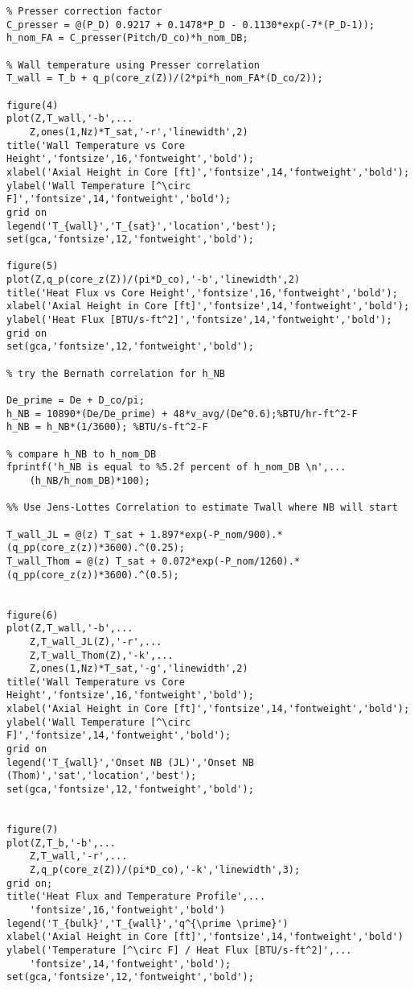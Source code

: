 \begin{fullwidth}
\begin{lstlisting}
% Presser correction factor
C_presser = @(P_D) 0.9217 + 0.1478*P_D - 0.1130*exp(-7*(P_D-1));
h_nom_FA = C_presser(Pitch/D_co)*h_nom_DB;

% Wall temperature using Presser correlation
T_wall = T_b + q_p(core_z(Z))/(2*pi*h_nom_FA*(D_co/2));

figure(4)
plot(Z,T_wall,'-b',...
    Z,ones(1,Nz)*T_sat,'-r','linewidth',2)
title('Wall Temperature vs Core Height','fontsize',16,'fontweight','bold');
xlabel('Axial Height in Core [ft]','fontsize',14,'fontweight','bold');
ylabel('Wall Temperature [^\circ F]','fontsize',14,'fontweight','bold');
grid on
legend('T_{wall}','T_{sat}','location','best');
set(gca,'fontsize',12,'fontweight','bold');

figure(5)
plot(Z,q_p(core_z(Z))/(pi*D_co),'-b','linewidth',2)
title('Heat Flux vs Core Height','fontsize',16,'fontweight','bold');
xlabel('Axial Height in Core [ft]','fontsize',14,'fontweight','bold');
ylabel('Heat Flux [BTU/s-ft^2]','fontsize',14,'fontweight','bold');
grid on
set(gca,'fontsize',12,'fontweight','bold');

% try the Bernath correlation for h_NB

De_prime = De + D_co/pi;
h_NB = 10890*(De/De_prime) + 48*v_avg/(De^0.6);%BTU/hr-ft^2-F
h_NB = h_NB*(1/3600); %BTU/s-ft^2-F

% compare h_NB to h_nom_DB
fprintf('h_NB is equal to %5.2f percent of h_nom_DB \n',...
    (h_NB/h_nom_DB)*100);

%% Use Jens-Lottes Correlation to estimate Twall where NB will start

T_wall_JL = @(z) T_sat + 1.897*exp(-P_nom/900).*(q_pp(core_z(z))*3600).^(0.25);
T_wall_Thom = @(z) T_sat + 0.072*exp(-P_nom/1260).*(q_pp(core_z(z))*3600).^(0.5);


figure(6)
plot(Z,T_wall,'-b',...
    Z,T_wall_JL(Z),'-r',...
    Z,T_wall_Thom(Z),'-k',...
    Z,ones(1,Nz)*T_sat,'-g','linewidth',2)
title('Wall Temperature vs Core Height','fontsize',16,'fontweight','bold');
xlabel('Axial Height in Core [ft]','fontsize',14,'fontweight','bold');
ylabel('Wall Temperature [^\circ F]','fontsize',14,'fontweight','bold');
grid on
legend('T_{wall}','Onset NB (JL)','Onset NB (Thom)','sat','location','best');
set(gca,'fontsize',12,'fontweight','bold');


figure(7)
plot(Z,T_b,'-b',...
    Z,T_wall,'-r',...
    Z,q_p(core_z(Z))/(pi*D_co),'-k','linewidth',3);
grid on;
title('Heat Flux and Temperature Profile',...
    'fontsize',16,'fontweight','bold')
legend('T_{bulk}','T_{wall}','q^{\prime \prime}')
xlabel('Axial Height in Core [ft]','fontsize',14,'fontweight','bold')
ylabel('Temperature [^\circ F] / Heat Flux [BTU/s-ft^2]',...
    'fontsize',14,'fontweight','bold');
set(gca,'fontsize',12,'fontweight','bold');
\end{lstlisting}

\end{fullwidth}
